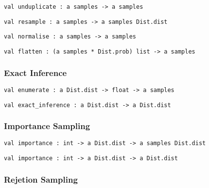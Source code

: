 \protect\hyperlink{val-unduplicate}{}\texttt{val\ unduplicate\ :\ \textquotesingle{}a\ samples\ -\textgreater{}\ \textquotesingle{}a\ samples}

\protect\hyperlink{val-resample}{}\texttt{val\ resample\ :\ \textquotesingle{}a\ samples\ -\textgreater{}\ \textquotesingle{}a\ samples\ Dist.dist}

\protect\hyperlink{val-normalise}{}\texttt{val\ normalise\ :\ \textquotesingle{}a\ samples\ -\textgreater{}\ \textquotesingle{}a\ samples}

\protect\hyperlink{val-flatten}{}\texttt{val\ flatten\ :\ (\textquotesingle{}a\ samples\ *\ Dist.prob)\ list\ -\textgreater{}\ \textquotesingle{}a\ samples}

\hypertarget{infux5fexact}{\subsubsection{\texorpdfstring{\protect\hyperlink{infux5fexact}{}Exact
Inference}{Exact Inference}}\label{infux5fexact}}

\protect\hyperlink{val-enumerate}{}\texttt{val\ enumerate\ :\ \textquotesingle{}a\ Dist.dist\ -\textgreater{}\ float\ -\textgreater{}\ \textquotesingle{}a\ samples}

\protect\hyperlink{val-exactux5finference}{}\texttt{val\ exact\_inference\ :\ \textquotesingle{}a\ Dist.dist\ -\textgreater{}\ \textquotesingle{}a\ Dist.dist}

\hypertarget{infux5fimp}{\subsubsection{\texorpdfstring{\protect\hyperlink{infux5fimp}{}Importance
Sampling}{Importance Sampling}}\label{infux5fimp}}

\protect\hyperlink{val-importance}{}\texttt{val\ importance\ :\ int\ -\textgreater{}\ \textquotesingle{}a\ Dist.dist\ -\textgreater{}\ \textquotesingle{}a\ samples\ Dist.dist}

\protect\hyperlink{val-importanceux27}{}\texttt{val\ importance\textquotesingle{}\ :\ int\ -\textgreater{}\ \textquotesingle{}a\ Dist.dist\ -\textgreater{}\ \textquotesingle{}a\ Dist.dist}

\hypertarget{rejux5fhelpers}{\subsubsection{\texorpdfstring{\protect\hyperlink{rejux5fhelpers}{}Rejetion
Sampling}{Rejetion Sampling}}\label{rejux5fhelpers}}

